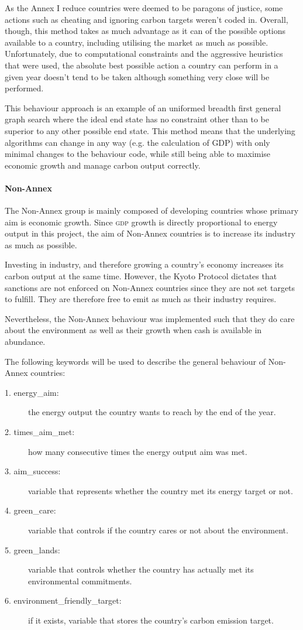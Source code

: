 As the Annex I reduce countries were deemed to be paragons of justice, some actions such as cheating and ignoring carbon targets weren't coded in. Overall, though, this method takes as much advantage as it can of the possible options available to a country, including utilising the market as much as possible. Unfortunately, due to computational constraints and the aggressive heuristics that were used, the absolute best possible action a country can perform in a given year doesn't tend to be taken although something very close will be performed.

This behaviour approach is an example of an uniformed breadth first general graph search where the ideal end state has no constraint other than to be superior to any other possible end state. This method means that the underlying algorithms can change in any way (e.g. the calculation of GDP) with only minimal changes to the behaviour code, while still being able to maximise economic growth and manage carbon output correctly.

\paragraph{Non-Annex}

The Non-Annex group is mainly composed of developing countries whose primary aim is economic growth. Since \textsc{gdp} growth is directly proportional to energy output in this project, the aim of Non-Annex countries is to increase its industry as much as possible. 

Investing in industry, and therefore growing a country's economy increases its carbon output at the same time. However, the Kyoto Protocol dictates that sanctions are not enforced on Non-Annex countries since they are not set targets to fulfill. They are therefore free to emit as much \CO as their industry requires.

Nevertheless, the Non-Annex behaviour was implemented such that they do care about the environment as well as their growth when cash is available in abundance.

The following keywords will be used to describe the general behaviour of Non-Annex countries:

\begin{description}
	\item[1. energy\_aim:] the energy output the country wants to reach by the end of the year.
	\item[2. times\_aim\_met:] how many consecutive times the energy output aim was met.
	\item[3. aim\_success:] variable that represents whether the country met its energy target or not.
	\item[4. green\_care:] variable that controls if the country cares or not about the environment.
	\item[5. green\_lands:] variable that controls whether the country has actually met its environmental commitments.
	\item[6. environment\_friendly\_target:] if it exists, variable that stores the country's carbon emission target. 
\end{description}

